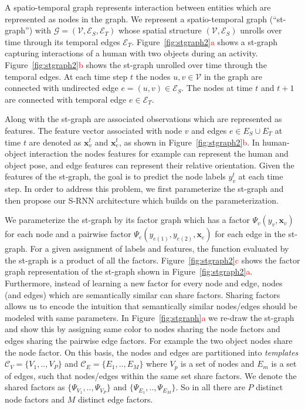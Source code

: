 \documentclass[10pt,twocolumn,letterpaper]{article}
\newcommand{\ve}[1]{\mathbf{#1}}
\newcommand{\mcal}[1]{\mathcal{#1}}
\newcommand{\rc}[1]{\textcolor{red}{#1}}
\begin{document}
A spatio-temporal graph represents interaction between entities which are represented as nodes in the graph. We represent a spatio-temporal graph (``st-graph'') with $\mathcal{G}=(\mathcal{V},\mathcal{E}_S,\mathcal{E}_T)$  whose spatial structure $(\mathcal{V},\mathcal{E}_S)$ unrolls over time through its temporal edges $\mathcal{E}_T$. Figure~\ref{fig:stgraph2}\rc{a} shows a  st-graph capturing interactions of a human with two objects during an activity.  Figure~\ref{fig:stgraph2}\rc{b} shows the st-graph unrolled over time through the temporal edges. At each time step $t$ the nodes $u,v \in \mcal{V}$ in the graph are connected with undirected edge $e=(u,v) \in \mcal{E}_S$. The nodes at time $t$ and $t+1$ are connected with temporal edge $e \in \mcal{E}_T$.


Along with the st-graph are associated observations which are represented as features. The feature vector associated with node $v$ and edges $e \in E_S \cup E_T$ at time $t$ are denoted as $\ve{x}_v^t$ and $\ve{x}_e^t$, as shown in Figure~\ref{fig:stgraph2}\rc{b}. In human-object interaction the nodes features for example can represent the human and object pose, and edge features can represent their relative orientation.  Given the features of the st-graph, the goal is to predict the node labels $y_v^t$ at each time step. In order to address this problem, we first parameterize the st-graph and then propose our S-RNN architecture which builds on the parameterization. 

We parameterize the st-graph by its factor graph which has a factor $\Psi_v(y_v,\ve{x}_v)$ for each node and a pairwise factor $\Psi_e(y_{e(1)},y_{e(2)},\ve{x}_e)$ for each edge in the st-graph. For a given assignment of labels and features, the function evaluated by the st-graph is a product of all the factors. Figure~\ref{fig:stgraph2}\rc{c} shows the factor graph representation of the st-graph shown in Figure~\ref{fig:stgraph2}\rc{a}. Furthermore, instead of learning a new factor for every node and edge, nodes (and edges) which are semantically similar can share factors. Sharing factors allows us to encode the intuition that semantically similar nodes/edges should be modeled with same parameters. In Figure~\ref{fig:stgraph}\rc{a} we re-draw the st-graph and show this by assigning same color to nodes sharing the node factors and edges sharing the pairwise edge factors. For example the two object nodes share the node factor. On this basis, the nodes and edges are partitioned into \textit{templates}$\mcal{C}_V=\{V_1,..,V_P\}$ and $\mcal{C}_E=\{E_1,..,E_M\}$ where $V_p$ is a set of nodes and $E_m$ is a set of edges, such that nodes/edges within the same set share factors. We denote the shared factors as $\{\Psi_{V_1},..,\Psi_{V_P}\}$ and $\{\Psi_{E_1},..,\Psi_{E_M}\}$. So in all there are $P$ distinct node factors and $M$ distinct edge factors. 
\end{document}
